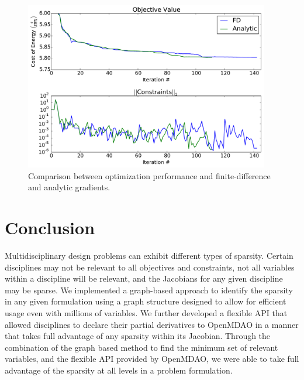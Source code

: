 \documentclass[]{aiaa-tc} %
\begin{document}
        \begin{figure}[!htbp]
          \centering
          \includegraphics[width=0.95\textwidth]{images/wt_opt_progress}
          \caption{Comparison between optimization performance and finite-difference and analytic gradients.}
          \label{fig:wt-opt-progress}
        \end{figure}




  \section{Conclusion}

    Multidisciplinary design problems can exhibit
      different types of sparsity. Certain
      disciplines may not be relevant to all objectives and constraints, not all variables within a discipline will
      be relevant, and the Jacobians for any given discipline may be sparse. We implemented a graph-based
      approach to identify the sparsity in any given formulation using a graph structure designed to allow for
      efficient usage even with millions of variables. We further developed a flexible API
      that allowed disciplines to declare their partial derivatives to OpenMDAO in a manner that
      takes full advantage of any sparsity within its Jacobian. Through the combination of the graph based
      method to find the minimum set of relevant variables, and the flexible API provided by OpenMDAO, we were able to take full
      advantage of the sparsity at all levels in a problem formulation.
\end{document}
